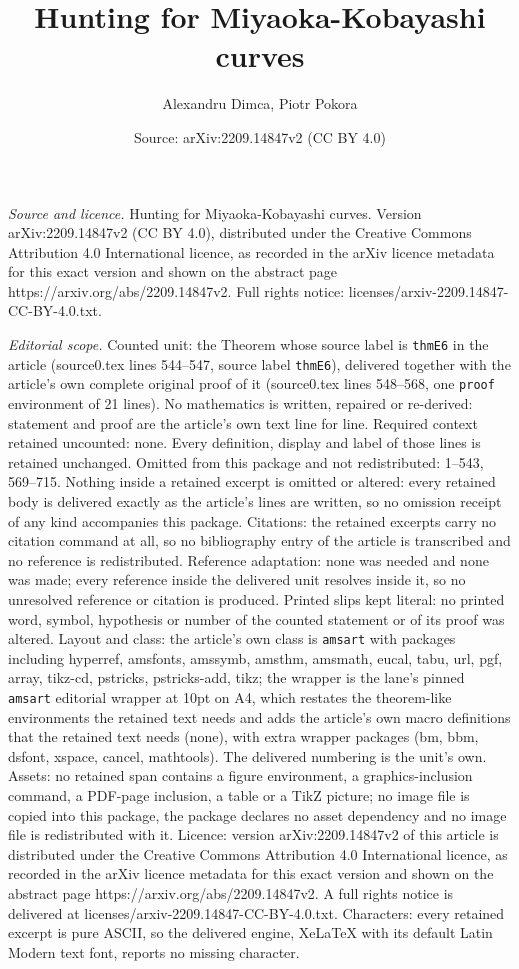 \documentclass[10pt,a4paper]{amsart}
\title[Hunting for Miyaoka-Kobayashi curves]{Hunting for Miyaoka-Kobayashi curves}
\author{Alexandru Dimca, Piotr Pokora}
\date{Source: arXiv:2209.14847v2 (CC BY 4.0)}
\begin{document}
\maketitle

\noindent\emph{Source and licence.} Hunting for Miyaoka-Kobayashi curves. Version arXiv:2209.14847v2 (CC BY 4.0), distributed under the Creative Commons Attribution 4.0 International licence, as recorded in the arXiv licence metadata for this exact version and shown on the abstract page https://arxiv.org/abs/2209.14847v2. Full rights notice: licenses/arxiv-2209.14847-CC-BY-4.0.txt.\par\smallskip

\noindent\textit{Editorial scope.} Counted unit: the Theorem whose source label is \texttt{thmE6} in the article (source0.tex lines 544--547, source label \texttt{thmE6}), delivered together with the article's own complete original proof of it (source0.tex lines 548--568, one \texttt{proof} environment of 21 lines). No mathematics is written, repaired or re-derived: statement and proof are the article's own text line for line. Required context retained uncounted: none. Every definition, display and label of those lines is retained unchanged. Omitted from this package and not redistributed: 1--543, 569--715. Nothing inside a retained excerpt is omitted or altered: every retained body is delivered exactly as the article's lines are written, so no omission receipt of any kind accompanies this package. Citations: the retained excerpts carry no citation command at all, so no bibliography entry of the article is transcribed and no reference is redistributed. Reference adaptation: none was needed and none was made; every reference inside the delivered unit resolves inside it, so no unresolved reference or citation is produced. Printed slips kept literal: no printed word, symbol, hypothesis or number of the counted statement or of its proof was altered. Layout and class: the article's own class is \texttt{amsart} with packages including hyperref, amsfonts, amssymb, amsthm, amsmath, eucal, tabu, url, pgf, array, tikz-cd, pstricks, pstricks-add, tikz; the wrapper is the lane's pinned \texttt{amsart} editorial wrapper at 10pt on A4, which restates the theorem-like environments the retained text needs and adds the article's own macro definitions that the retained text needs (none), with extra wrapper packages (bm, bbm, dsfont, xspace, cancel, mathtools). The delivered numbering is the unit's own. Assets: no retained span contains a figure environment, a graphics-inclusion command, a PDF-page inclusion, a table or a TikZ picture; no image file is copied into this package, the package declares no asset dependency and no image file is redistributed with it. Licence: version arXiv:2209.14847v2 of this article is distributed under the Creative Commons Attribution 4.0 International licence, as recorded in the arXiv licence metadata for this exact version and shown on the abstract page https://arxiv.org/abs/2209.14847v2. A full rights notice is delivered at licenses/arxiv-2209.14847-CC-BY-4.0.txt. Characters: every retained excerpt is pure ASCII, so the delivered engine, XeLaTeX with its default Latin Modern text font, reports no missing character.
\end{document}
